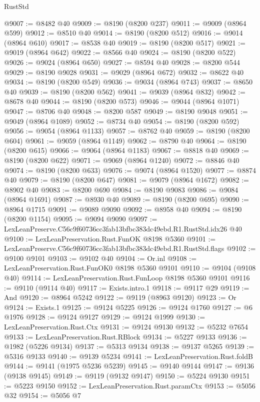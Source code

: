 \begin{lexlean}{RustStd}
\begin{coremodule}
@9007 := @8482 @40
@9009 := @8190 (@8200 @237)
@9011 := @9009 (@8964 @599)
@9012 := @8510 @40
@9014 := @8190 (@8200 @512)
@9016 := @9014 (@8964 @610)
@9017 := @8538 @40
@9019 := @8190 (@8200 @517)
@9021 := @9019 (@8964 @642)
@9022 := @8566 @40
@9024 := @8190 (@8200 @522)
@9026 := @9024 (@8964 @650)
@9027 := @8594 @40
@9028 := @8200 @544
@9029 := @8190 @9028
@9031 := @9029 (@8964 @672)
@9032 := @8622 @40
@9034 := @8190 (@8200 @549)
@9036 := @9034 (@8964 @743)
@9037 := @8650 @40
@9039 := @8190 (@8200 @562)
@9041 := @9039 (@8964 @832)
@9042 := @8678 @40
@9044 := @8190 (@8200 @573)
@9046 := @9044 (@8964 @1071)
@9047 := @8706 @40
@9048 := @8200 @587
@9049 := @8190 @9048
@9051 := @9049 (@8964 @1089)
@9052 := @8734 @40
@9054 := @8190 (@8200 @592)
@9056 := @9054 (@8964 @1133)
@9057 := @8762 @40
@9059 := @8190 (@8200 @604)
@9061 := @9059 (@8964 @1149)
@9062 := @8790 @40
@9064 := @8190 (@8200 @615)
@9066 := @9064 (@8964 @1183)
@9067 := @8818 @40
@9069 := @8190 (@8200 @622)
@9071 := @9069 (@8964 @1240)
@9072 := @8846 @40
@9074 := @8190 (@8200 @633)
@9076 := @9074 (@8964 @1520)
@9077 := @8874 @40
@9079 := @8190 (@8200 @647)
@9081 := @9079 (@8964 @1672)
@9082 := @8902 @40
@9083 := @8200 @690
@9084 := @8190 @9083
@9086 := @9084 (@8964 @1691)
@9087 := @8930 @40
@9089 := @8190 (@8200 @695)
@9090 := @8964 @1715
@9091 := @9089 @9090
@9092 := @8958 @40
@9094 := @8190 (@8200 @1154)
@9095 := @9094 @9090
@9097 := LexLeanPreserve.C56c9f60736cc3fab13bfbc383dc49ebd.R1.RustStd.idx26 @40
@9100 := LexLeanPreservation.Rust.FunOK @8198 @5360
@9101 := LexLeanPreserve.C56c9f60736cc3fab13bfbc383dc49ebd.R1.RustStd.flags
@9102 := @9100 @9101
@9103 := @9102 @40
@9104 := Or.inl
@9108 := LexLeanPreservation.Rust.FunOK0 @8198 @5360 @9101
@9110 := @9104 (@9108 @40)
@9114 := LexLeanPreservation.Rust.FunLoop @8198 @5360 @9101
@9116 := @9110 (@9114 @40)
@9117 := Exists.intro.{1}
@9118 := @9117 @29
@9119 := And
@9120 := @8964 @5242
@9122 := @9119 (@8963 @9120)
@9123 := Or
@9124 := Exists.{1}
@9125 := @9124 @5225
@9126 := @9124 @1760
@9127 := @6 @1976
@9128 := @9124 @9127
@9129 := @9124 @1999
@9130 := LexLeanPreservation.Rust.Ctx
@9131 := @9124 @9130
@9132 := @5232 @7654
@9133 := LexLeanPreservation.Rust.RBlock
@9134 := @5227 @9133
@9136 := @1982 (@5226 @9134)
@9137 := @5313 @9134
@9138 := @9137 @5265
@9139 := @5316 @9133
@9140 := @9139 @5234
@9141 := LexLeanPreservation.Rust.foldB
@9144 := @9141 (@1975 @5236 @5239)
@9145 := @9140 @9144
@9147 := @9136 (@9138 @9145)
@9149 := @9119 (@9132 @9147)
@9150 := @5224 @9130
@9151 := @5223 @9150
@9152 := LexLeanPreservation.Rust.paramCtx
@9153 := @5056 @32
@9154 := @5056 @7

\end{coremodule}
\end{lexlean}
